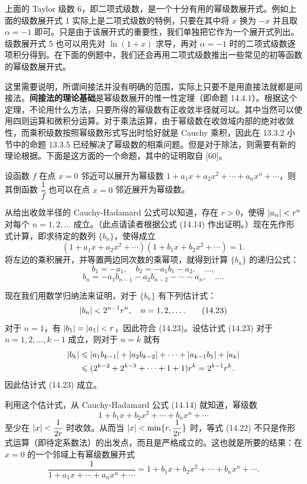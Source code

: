 \begin{xremark}
上面的 Taylor 级数 6，即二项式级数，是一个十分有用的幂级数展开式。例如上面的级数展开式 1 实际上是二项式级数的特例，只要在其中将 $x$ 换为 $-x$ 并且取 $\alpha=-1$ 即可。只是由于该展开式的重要性，我们单独把它作为一个展开式列出。级数展开式 5 也可以用先对 $\ln(1+x)$ 求导，再对 $\alpha=-1$ 时的二项式级数逐项积分得到。在下面的例题中，我们还会再用二项式级数推出一些常见的初等函数的幂级数展开式。

这里需要说明，所谓间接法并没有明确的范围，实际上只要不是用直接法就都是间接法。\textbf{间接法的理论基础}是幂级数展开的惟一性定理（即命题 14.4.1）。根据这个定理，不论用什么方法，只要所得的幂级数有正收敛半径就可以。其中当然可以使用四则运算和微积分运算。对于乘法运算，由于幂级数在收敛域内部的绝对收敛性，而乘积级数按照幂级数形式写出时恰好就是 Cauchy 乘积，因此在 13.3.2 小节中的命题 13.3.5 已经解决了幂级数的相乘问题。但是对于除法，则需要有新的理论根据。下面是这方面的一个命题，其中的证明取自 [60]。
\end{xremark}

\begin{xproposition}[14.4.4]
设函数 $f$ 在点 $x=0$ 邻近可以展开为幂级数 $1+a_1x+a_2x^2+\cdots+a_nx^n+\cdots$，则其倒函数 $\dfrac1f$ 也可以在点 $x=0$ 邻近展开为幂级数。
\end{xproposition}
\begin{xproof}
从给出收敛半径的 Cauchy-Hadamard 公式可以知道，存在 $r>0$，使得 $\lvert a_n\rvert<r^n$ 对每个 $n=1,2,\ldots$ 成立。（此点请读者根据公式 (14.14) 作出证明。）现在先作形式计算，即求待定的数列 $\{b_n\}$，使得成立
\begin{equation}
  (1+a_1x+a_2x^2+\cdots)(1+b_1x+b_2x^2+\cdots)=1.
  \tag{14.22}
  \label{eq:14.22}
\end{equation}
将左边的乘积展开，并等置两边同次数的乘幂项，就得到计算 $\{b_n\}$ 的递归公式：
\[
  b_1=-a_1,\quad b_2=-a_1b_1-a_2,\quad\ldots,
\]
\[
  b_n=-a_1b_{n-1}-a_2b_{n-2}-\cdots-a_n,\quad\ldots.
\]

现在我们用数学归纳法来证明，对于 $\{b_n\}$ 有下列估计式：
\begin{equation}
  \lvert b_n\rvert<2^{n-1}r^n,\quad n=1,2,\ldots.
  \tag{14.23}
  \label{eq:14.23}
\end{equation}
对于 $n=1$，有 $\lvert b_1\rvert=\lvert a_1\rvert<r$，因此符合 (14.23)。设估计式 (14.23) 对于 $n=1,2,\ldots,k-1$ 成立，则对于 $n=k$ 就有
\[
\begin{aligned}
  \lvert b_k\rvert&\leqslant\lvert a_1b_{k-1}\rvert+\lvert a_2b_{k-2}\rvert+\cdots+\lvert a_{k-1}b_1\rvert+\lvert a_k\rvert\\
  &\leqslant(2^{k-2}+2^{k-3}+\cdots+1+1)r^k=2^{k-1}r^k.
\end{aligned}
\]
因此估计式 (14.23) 成立。

利用这个估计式，从 Cauchy-Hadamard 公式 (14.14) 就知道，幂级数
\[
  1+b_1x+b_2x^2+\cdots+b_nx^n+\cdots
\]
至少在 $\lvert x\rvert<\dfrac1{2r}$ 时收敛。从而当 $\lvert x\rvert<\min\{r,\dfrac1{2r}\}$ 时，等式 (14.22) 不只是作形式运算（即待定系数法）的出发点，而且是严格成立的。这也就是所要的结果：在 $x=0$ 的一个邻域上有幂级数展开式
\[
  \frac1{1+a_1x+\cdots+a_nx^n+\cdots}=1+b_1x+b_2x^2+\cdots+b_nx^n+\cdots.
\]
\end{xproof}

